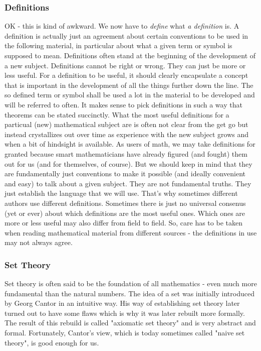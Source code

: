 \subsubsection{Definitions}
OK - this is kind of awkward. We now have to \emph{define} what \emph{a definition} is. A definition is actually just an agreement about certain conventions to be used in the following material, in particular about what a given term or symbol is supposed to mean. Definitions often stand at the beginning of the development of a new subject. Definitions cannot be right or wrong. They can just be more or less useful. For a definition to be useful, it should clearly encapsulate a concept that is important in the development of all the things further down the line. The so defined term or symbol shall be used a lot in the material to be developed and will be referred to often. It makes sense to pick definitions in such a way that theorems can be stated succinctly. What the most useful definitions for a particual (new) mathematical subject are is often not clear from the get go but instead crystallizes out over time as experience with the new subject grows and when a bit of hindsight is available. As users of math, we may take definitions for granted because smart mathematicians have already figured (and fought) them out for us (and for themselves, of course). But we should keep in mind that they are fundamentally just conventions to make it possible (and ideally convenient and easy) to talk about a given subject. They are not fundamental truths. They just establish the language that we will use. That's why sometimes different authors use different definitions. Sometimes there is just no universal consenus (yet or ever) about which definitions are the most useful ones. Which ones are more or less useful may also differ from field to field. So, care has to be taken when reading mathematical material from different sources - the definitions in use may not always agree.

\subsubsection{Set Theory}
Set theory is often said to be the foundation of all mathematics - even much more fundamental than the natural numbers. 
The idea of a set was initially introduced by Georg Cantor in an intuitive way. His way of establishing set theory later turned out to have some flaws which is why it was later rebuilt more formally. The result of this rebuild is called "axiomatic set theory" and is very abstract and formal. Fortunately, Cantor's view, which is today sometimes called "naive set theory", is good enough for us. 

